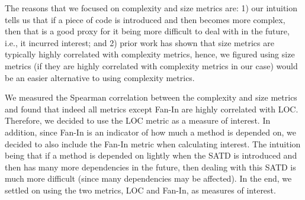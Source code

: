 \documentclass[10pt, conference]{IEEEtran}
\begin{document}
The reasons that we focused on complexity and size metrics are: 1) our intuition tells us that if a piece of code is introduced and then becomes more complex, then that is a good proxy for it being more difficult to deal with in the future, i.e., it incurred interest; and 2) prior work has shown that size metrics are typically highly correlated with complexity metrics, hence, we figured using size metrics (if they are highly correlated with complexity metrics in our case) would be an easier alternative to using complexity metrics.

We measured the Spearman correlation between the complexity and size metrics and found that indeed all metrics except Fan-In are highly correlated with LOC. Therefore, we decided to use the LOC metric as a measure of interest. In addition, since Fan-In is an indicator of how much a method is depended on, we decided to also include the Fan-In metric when calculating interest. The intuition being that if a method is depended on lightly when the SATD is introduced and then has many more dependencies in the future, then dealing with this SATD is much more difficult (since many dependencies may be affected). In the end, we settled on using the two metrics, LOC and Fan-In, as measures of interest.

\end{document}
